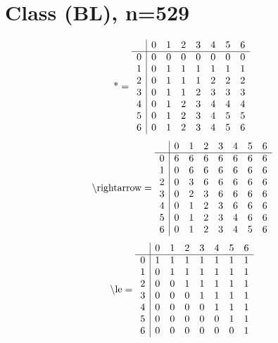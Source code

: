 \documentclass[11pt]{article}
\begin{document}
\section{Class (BL), n=529}
\[\text{*} = 
\begin{array}{r | r r r r r r r}
 & 0 & 1 & 2 & 3 & 4 & 5 & 6 \\ \hline
0 & 0 & 0 & 0 & 0 & 0 & 0 & 0 \\
1 & 0 & 1 & 1 & 1 & 1 & 1 & 1 \\
2 & 0 & 1 & 1 & 1 & 2 & 2 & 2 \\
3 & 0 & 1 & 1 & 2 & 3 & 3 & 3 \\
4 & 0 & 1 & 2 & 3 & 4 & 4 & 4 \\
5 & 0 & 1 & 2 & 3 & 4 & 5 & 5 \\
6 & 0 & 1 & 2 & 3 & 4 & 5 & 6 \\
\end{array}
\]
\[\text{\textbackslash rightarrow} = 
\begin{array}{r | r r r r r r r}
 & 0 & 1 & 2 & 3 & 4 & 5 & 6 \\ \hline
0 & 6 & 6 & 6 & 6 & 6 & 6 & 6 \\
1 & 0 & 6 & 6 & 6 & 6 & 6 & 6 \\
2 & 0 & 3 & 6 & 6 & 6 & 6 & 6 \\
3 & 0 & 2 & 3 & 6 & 6 & 6 & 6 \\
4 & 0 & 1 & 2 & 3 & 6 & 6 & 6 \\
5 & 0 & 1 & 2 & 3 & 4 & 6 & 6 \\
6 & 0 & 1 & 2 & 3 & 4 & 5 & 6 \\
\end{array}
\]
\[\text{\textbackslash le} = 
\begin{array}{r | r r r r r r r}
 & 0 & 1 & 2 & 3 & 4 & 5 & 6 \\ \hline
0 & 1 & 1 & 1 & 1 & 1 & 1 & 1 \\
1 & 0 & 1 & 1 & 1 & 1 & 1 & 1 \\
2 & 0 & 0 & 1 & 1 & 1 & 1 & 1 \\
3 & 0 & 0 & 0 & 1 & 1 & 1 & 1 \\
4 & 0 & 0 & 0 & 0 & 1 & 1 & 1 \\
5 & 0 & 0 & 0 & 0 & 0 & 1 & 1 \\
6 & 0 & 0 & 0 & 0 & 0 & 0 & 1 \\
\end{array}
\]
\end{document}
